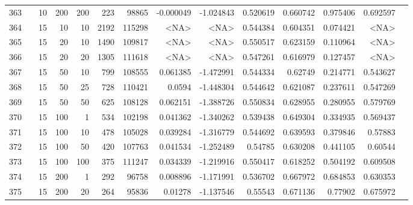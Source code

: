 \begin{longtable}{llrrrrrrrrrrrr}
		363 & &           10 &               200 &          200 &         223 &      98865 & -0.000049 & -1.024843 &  0.520619 &    0.660742 &       0.975406 &  0.692597 \\
		364 & &           15 &                10 &           10 &           2192 &     115298 &      <NA> &      <NA> &  0.544384 &    0.604351 &       0.074421 &  <NA> \\
		365 & &           15 &                20 &           10 &           1490 &     109817 &      <NA> &      <NA> &  0.550517 &    0.623159 &       0.110964 &   <NA> \\
		366 & &           15 &                20 &           20 &           1305 &     111618 &      <NA> &      <NA> &  0.547261 &    0.616979 &       0.127457 &  <NA> \\
		367 & &           15 &                50 &           10 &         799 &     108555 &  0.061385 & -1.472991 &  0.544334 &     0.62749 &       0.214771 &  0.543627 \\
		368 & &           15 &                50 &           25 &         728 &     110421 &    0.0594 & -1.448304 &  0.544642 &    0.621087 &       0.237611 &  0.547269 \\
		369 & &           15 &                50 &           50 &         625 &     108128 &  0.062151 & -1.388726 &  0.550834 &    0.628955 &       0.280955 &  0.579769 \\
		370 & &           15 &               100 &            1 &         534 &     102198 &  0.041362 & -1.340262 &  0.539438 &    0.649304 &       0.334935 &  0.569437 \\
		371 & &           15 &               100 &           10 &         478 &     105028 &  0.039284 & -1.316779 &  0.544692 &    0.639593 &       0.379846 &   0.57883 \\
		372 & &           15 &               100 &           50 &         420 &     107763 &  0.041534 & -1.252489 &   0.54785 &    0.630208 &       0.441105 &   0.60544 \\
		373 & &           15 &               100 &          100 &         375 &     111247 &  0.034339 & -1.219916 &  0.550417 &    0.618252 &       0.504192 &  0.609508 \\
		374 & &           15 &               200 &            1 &         292 &      96758 &  0.008896 & -1.171991 &  0.536702 &    0.667972 &       0.684853 &  0.630353 \\
		375 & &           15 &               200 &           20 &         264 &      95836 &   0.01278 & -1.137546 &   0.55543 &    0.671136 &        0.77902 &  0.675972 \\

\end{longtable}
